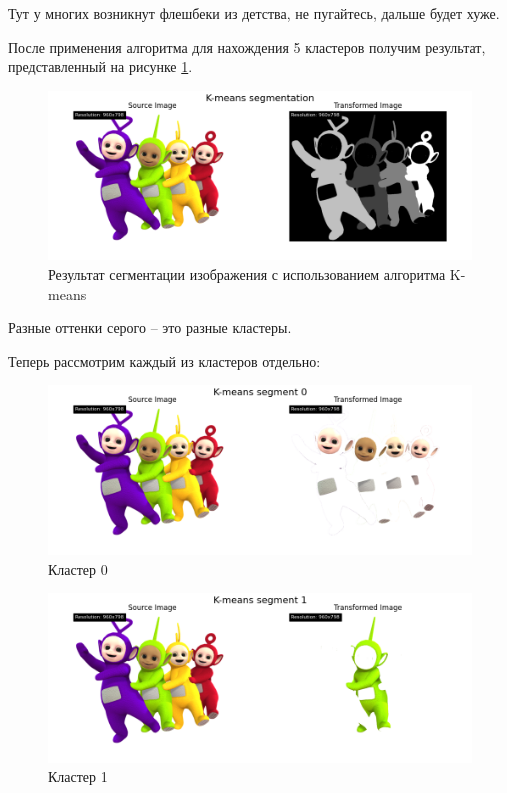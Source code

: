 Тут у многих возникнут флешбеки из детства, не пугайтесь, дальше будет хуже. 

После применения алгоритма для нахождения 5 кластеров получим результат, представленный на рисунке \ref{img:kmeans_segmentation}.
\begin{figure}[ht!]
    \centering
    \includegraphics[width=\textwidth]{../results/K-means segmentation.png}
    \caption{Результат сегментации изображения с использованием алгоритма K-means}
    \label{img:kmeans_segmentation}
\end{figure}
Разные оттенки серого -- это разные кластеры. 

Теперь рассмотрим каждый из кластеров отдельно: 

\begin{figure}[ht!]
    \centering
    \includegraphics[width=\textwidth]{../results/K-means segment 0.png}
    \caption{Кластер 0}
    \label{img:kmeans_cluster_0}
\end{figure}

\begin{figure}[ht!]
    \centering
    \includegraphics[width=\textwidth]{../results/K-means segment 1.png}
    \caption{Кластер 1}
    \label{img:kmeans_cluster_1}
\end{figure}

